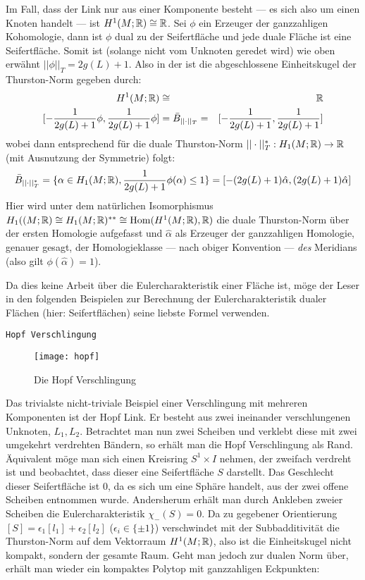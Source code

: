         Im Fall, dass der Link nur aus einer Komponente besteht --- es sich also um einen Knoten handelt --- ist $H^1(M;\mathbb{R})\cong \mathbb{R}$. Sei $\phi$ ein Erzeuger der ganzzahligen Kohomologie, dann ist $\phi$ dual zu der Seifertfläche und jede duale Fläche ist eine Seifertfläche. Somit ist (solange nicht vom Unknoten geredet wird) wie oben erwähnt $||\phi||_T=2g(L)+1$. Also in der ist die abgeschlossene Einheitskugel der Thurston-Norm gegeben durch:
        \begin{eqnarray*}
            H^1(M;\mathbb{R}) &\cong & \mathbb{R} \\
            {[- \frac{1}{2g(L)+1} \phi,\frac 1 {2g(L)+1} \phi]} & = \bar B_{||\cdot||_T}=& {[- \frac 1 {2g(L)+1}, \frac 1 {2g(L)+1}]}
        \end{eqnarray*}
        wobei dann entsprechend für die duale Thurston-Norm $||\cdot||_T^* : H_1(M;\mathbb{R})\to \mathbb{R}$ (mit Ausnutzung der Symmetrie) folgt:
        \[
            \bar B_{||\cdot||_T^*} = \{\alpha \in H_1(M;\mathbb{R}), \frac{1}{2g(L)+1}\phi (\alpha)\leq 1\} = {[-(2g(L)+1)\hat \alpha, (2g(L)+1) \hat \alpha]}
        \]
        Hier wird unter dem natürlichen Isomorphismus $H_1((M;\mathbb{R}) \cong H_1(M;\mathbb{R})^{**} \cong \operatorname{Hom}(H^1(M;\mathbb{R}),\mathbb{R})$ die duale Thurston-Norm über der ersten Homologie aufgefasst und $\hat \alpha$ als Erzeuger der ganzzahligen Homologie, genauer gesagt, der Homologieklasse --- nach obiger Konvention --- \emph{des} Meridians (also gilt $\phi(\hat \alpha)=1$). 
        \begin{bem}
            Da dies keine Arbeit über die Eulercharakteristik einer Fläche ist, möge der Leser in den folgenden Beispielen zur Berechnung der Eulercharakteristik dualer Flächen (hier: Seifertflächen) seine liebste Formel verwenden.
        \end{bem}
        \texttt{Hopf Verschlingung}
        \begin{wrapfigure}{r}{0.4\textwidth}
            \centering
            \texttt{[image: hopf]}
            \caption{Die Hopf Verschlingung}
            \label{fig:hopf}
        \end{wrapfigure}
        Das trivialste nicht-triviale Beispiel einer Verschlingung mit mehreren Komponenten ist der Hopf Link. Er besteht aus zwei ineinander verschlungenen Unknoten, $L_1, L_2$. Betrachtet man nun zwei Scheiben und verklebt diese mit zwei umgekehrt verdrehten Bändern, so erhält man die Hopf Verschlingung als Rand. Äquivalent möge man sich einen Kreisring $S^1 \times I$ nehmen, der zweifach verdreht ist und beobachtet, dass dieser eine Seifertfläche $S$ darstellt. Das Geschlecht dieser Seifertfläche ist $0$, da es sich um eine Sphäre handelt, aus der zwei offene Scheiben entnommen wurde. Andersherum erhält man durch Ankleben zweier Scheiben die Eulercharakteristik $\chi_-(S)=0$. Da zu gegebener Orientierung $[S] = \epsilon_1 [l_1]+ \epsilon_2 [l_2]$ ($\epsilon_i \in \{\pm 1\}$) verschwindet mit der Subbadditivität die Thurston-Norm auf dem Vektorraum $H^1(M;\mathbb{R})$, also ist die Einheitskugel nicht kompakt, sondern der gesamte Raum. Geht man jedoch zur dualen Norm über, erhält man wieder ein kompaktes Polytop mit ganzzahligen Eckpunkten: 
